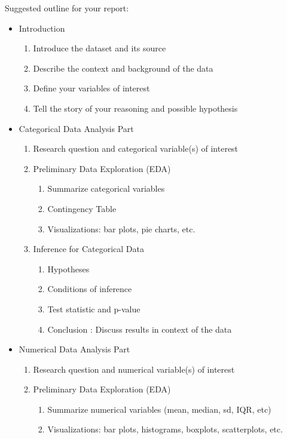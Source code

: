 \documentclass[12pt]{article}
\begin{document}
Suggested outline for your report:
\begin{itemize}
    \item Introduction
    \begin{enumerate}
        \item Introduce the dataset and its source
        \item Describe the context and background of the data
        \item Define your variables of interest
        \item Tell the story of your reasoning and possible hypothesis
    \end{enumerate}
    \item Categorical Data Analysis Part
    \begin{enumerate}
        \item Research question and categorical variable(s) of interest
        \item Preliminary Data Exploration (EDA)
            \begin{enumerate}
            \item Summarize categorical variables
            \item Contingency Table
            \item Visualizations: bar plots, pie charts, etc.
            \end{enumerate}
        \item Inference for Categorical Data
        \begin{enumerate}
            \item Hypotheses
            \item Conditions of inference
            \item Test statistic and p-value
            \item Conclusion : Discuss results in context of the data
        \end{enumerate}
    \end{enumerate}
    \item Numerical Data Analysis Part
        \begin{enumerate}
             \item Research question and numerical variable(s) of interest
             \item Preliminary Data Exploration (EDA)
            \begin{enumerate}
                \item Summarize numerical variables (mean, median, sd, IQR, etc)
                \item Visualizations: bar plots, histograms, boxplots, scatterplots, etc.

\end{enumerate}
\end{enumerate}
\end{itemize}
\end{document}
